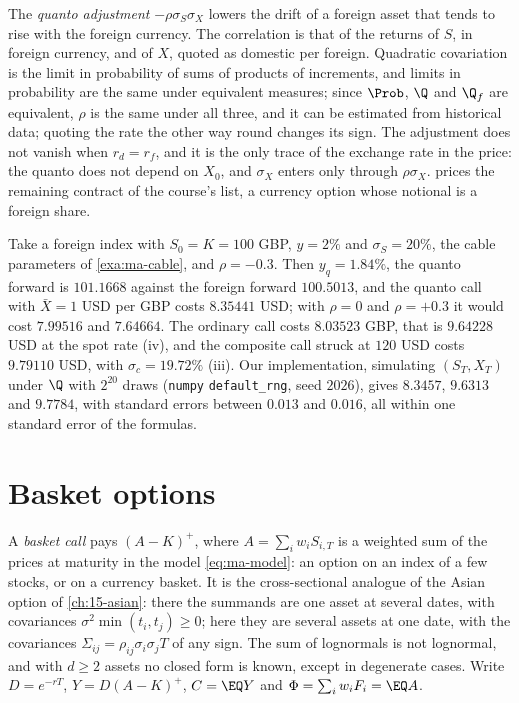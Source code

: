 The \emph{quanto adjustment} $-\rho\sigma_S\sigma_X$ lowers the drift of a foreign asset that tends to
rise with the foreign currency. The correlation is that of the returns of $S$, in foreign
currency, and of $X$, quoted as domestic per foreign. Quadratic covariation is the limit in
probability of sums of products of increments, and limits in probability are the same under
equivalent measures; since $\Prob$, $\Q$ and $\Q_f$ are equivalent, $\rho$ is the same under all three, and it
can be estimated from historical data; quoting the rate the other way round changes its sign. The
adjustment does not vanish when $r_d=r_f$, and it is the only trace of the exchange rate in the
price: the quanto does not depend on $X_0$, and $\sigma_X$ enters only through $\rho\sigma_X$.
 prices the remaining contract of the course's list, a currency option whose
notional is a foreign share.

\begin{example}\label{exa:ma-quanto}
Take a foreign index with $S_0=K=100$ GBP, $y=2\%$ and $\sigma_S=20\%$, the cable parameters of
\cref{exa:ma-cable}, and $\rho=-0.3$. Then $y_q=1.84\%$, the quanto forward is $101.1668$ against
the foreign forward $100.5013$, and the quanto call with $\bar X=1$ USD per GBP costs $8.35441$
USD; with $\rho=0$ and $\rho=+0.3$ it would cost $7.99516$ and $7.64664$. The ordinary call costs
$8.03523$ GBP, that is $9.64228$ USD at the spot rate (iv), and the composite call struck at $120$
USD costs $9.79110$ USD, with $\sigma_c=19.72\%$ (iii). Our implementation, simulating $(S_T,X_T)$
under $\Q$ with $2^{20}$ draws (\texttt{numpy} \texttt{default\_rng}, seed $2026$), gives $8.3457$, $9.6313$
and $9.7784$, with standard errors between $0.013$ and $0.016$, all within one standard error of the formulas.
\end{example}

\section{Basket options}\label{sec:ma-basket}

A \emph{basket call} pays $(A-K)^+$, where $A=\sum_iw_iS_{i,T}$ is a weighted sum of the prices
at maturity in the model \eqref{eq:ma-model}: an option on an index of a few stocks, or on a
currency basket. It is the cross-sectional analogue of the Asian option of
\cref{ch:15-asian}: there the summands are one asset at several dates, with covariances
$\sigma^2\min(t_i,t_j)\ge0$; here they are several assets at one date, with the covariances
$\Sigma_{ij}=\rho_{ij}\sigma_i\sigma_jT$ of any sign. The sum of lognormals is not lognormal, and
with $d\ge2$ assets no closed form is known, except in degenerate cases. Write
$D=e^{-rT}$, $Y=D(A-K)^+$, $C=\EQ Y$ and $\Phi=\sum_iw_iF_i=\EQ A$.

